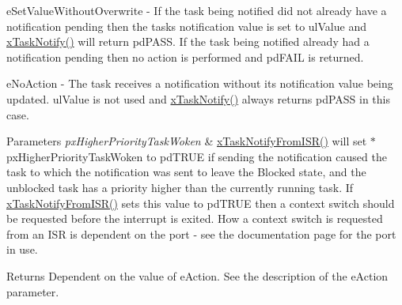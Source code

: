 e\+Set\+Value\+Without\+Overwrite -\/ If the task being notified did not already have a notification pending then the task\textquotesingle{}s notification value is set to ul\+Value and \hyperlink{vendor_2ceedling_2plugins_2freertos_2src_2freertos_2include_2task_8h_a0d2d54fb8a64011dfbb54983e4ed06bd}{x\+Task\+Notify()} will return pd\+P\+A\+SS. If the task being notified already had a notification pending then no action is performed and pd\+F\+A\+IL is returned.

e\+No\+Action -\/ The task receives a notification without its notification value being updated. ul\+Value is not used and \hyperlink{vendor_2ceedling_2plugins_2freertos_2src_2freertos_2include_2task_8h_a0d2d54fb8a64011dfbb54983e4ed06bd}{x\+Task\+Notify()} always returns pd\+P\+A\+SS in this case.


\begin{DoxyParams}{Parameters}
{\em px\+Higher\+Priority\+Task\+Woken} & \hyperlink{vendor_2ceedling_2plugins_2freertos_2src_2freertos_2include_2task_8h_a1ed9129068b96a909356bd0369c5ecb0}{x\+Task\+Notify\+From\+I\+S\+R()} will set $\ast$px\+Higher\+Priority\+Task\+Woken to pd\+T\+R\+UE if sending the notification caused the task to which the notification was sent to leave the Blocked state, and the unblocked task has a priority higher than the currently running task. If \hyperlink{vendor_2ceedling_2plugins_2freertos_2src_2freertos_2include_2task_8h_a1ed9129068b96a909356bd0369c5ecb0}{x\+Task\+Notify\+From\+I\+S\+R()} sets this value to pd\+T\+R\+UE then a context switch should be requested before the interrupt is exited. How a context switch is requested from an I\+SR is dependent on the port -\/ see the documentation page for the port in use.\\
\hline
\end{DoxyParams}
\begin{DoxyReturn}{Returns}
Dependent on the value of e\+Action. See the description of the e\+Action parameter. 
\end{DoxyReturn}
